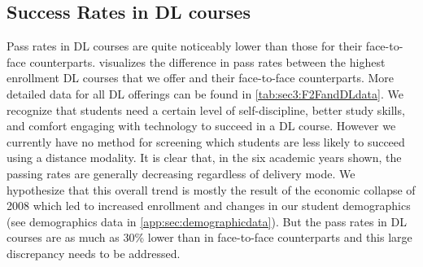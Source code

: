 \subsection{Success Rates in DL courses}
Pass rates in DL courses are quite noticeably lower than those for their face-to-face counterparts.  visualizes the difference in pass rates between the highest enrollment DL courses that we offer and their face-to-face counterparts. More detailed data for all DL offerings can be found in \cref{tab:sec3:F2FandDLdata}. We recognize that students need a certain level of self-discipline, better study skills, and comfort engaging with technology to succeed in a DL course. However we currently have no method for screening which students are less likely to succeed using a distance modality.    It is clear that, in the six academic years shown, the passing rates are generally decreasing regardless of delivery mode.  We hypothesize that this overall trend is mostly the result of the economic collapse of 2008 which led to increased enrollment and changes in our student demographics (see demographics data in \vref{app:sec:demographicdata}).  But the pass rates in DL courses are as much as 30\% lower than in face-to-face counterparts and this large discrepancy needs to be addressed.

